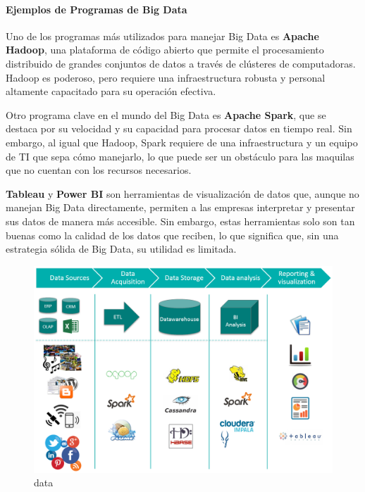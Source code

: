 \documentclass[
  10pt,
  letterpaper,
]{book}
\let\oldparagraph\paragraph
\renewcommand{\paragraph}[1]{\oldparagraph{#1}\mbox{}}
\begin{document}
\paragraph{Ejemplos de Programas de Big
Data}\label{ejemplos-de-programas-de-big-data}

Uno de los programas más utilizados para manejar Big Data es
\textbf{Apache Hadoop}, una plataforma de código abierto que permite el
procesamiento distribuido de grandes conjuntos de datos a través de
clústeres de computadoras. Hadoop es poderoso, pero requiere una
infraestructura robusta y personal altamente capacitado para su
operación efectiva.

Otro programa clave en el mundo del Big Data es \textbf{Apache Spark},
que se destaca por su velocidad y su capacidad para procesar datos en
tiempo real. Sin embargo, al igual que Hadoop, Spark requiere de una
infraestructura y un equipo de TI que sepa cómo manejarlo, lo que puede
ser un obstáculo para las maquilas que no cuentan con los recursos
necesarios.

\textbf{Tableau} y \textbf{Power BI} son herramientas de visualización
de datos que, aunque no manejan Big Data directamente, permiten a las
empresas interpretar y presentar sus datos de manera más accesible. Sin
embargo, estas herramientas solo son tan buenas como la calidad de los
datos que reciben, lo que significa que, sin una estrategia sólida de
Big Data, su utilidad es limitada.

\begin{figure}[H]

{\centering \includegraphics{Img/data.png}

}

\caption{data}

\end{figure}%
\end{document}
